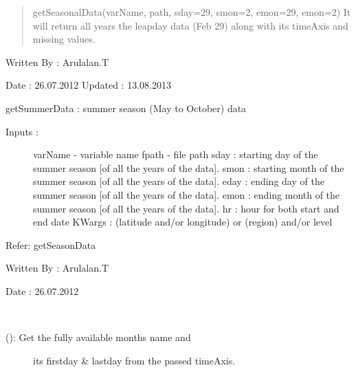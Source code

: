 \documentclass[letterpaper,10pt,english]{sphinxmanual}
\begin{document}
\begin{fulllineitems}
\begin{fulllineitems}
\begin{description}
\begin{description}
\begin{quote}
getSeasonalData(varName, path, sday=29, smon=2, emon=29, emon=2)
It will return all years the leapday data (Feb 29) along with
its timeAxis and missing values.
\end{quote}

\end{description}

\end{description}

Written By : Arulalan.T

Date : 26.07.2012
Updated : 13.08.2013

\end{fulllineitems}


\begin{fulllineitems}
\label{diagnosisutils:xml_data_access.TimeUtility.getSummerData}
getSummerData : summer season (May to October) data
\begin{description}
\item[{Inputs :}] \leavevmode
varName - variable name
fpath - file path
sday : starting day of the summer season {[}of all the years of the data{]}.
smon : starting month of the summer season {[}of all the years of the data{]}.
eday : ending day of the summer season {[}of all the years of the data{]}.
emon : ending month of the summer season {[}of all the years of the data{]}.
hr : hour for both start and end date
KWargs : (latitude and/or longitude) or (region) and/or level

\end{description}

Refer: getSeasonData

Written By : Arulalan.T

Date : 26.07.2012

\end{fulllineitems}


\begin{fulllineitems}
\label{diagnosisutils:xml_data_access.TimeUtility.getTimeAxisFullMonths}~\begin{description}
\item[{{\hyperref[diagnosisutils:xml_data_access.TimeUtility.getTimeAxisFullMonths]{}} (): Get the fully available months name and}] \leavevmode
its firstday \& lastday from the passed timeAxis.


\end{description}
\end{fulllineitems}
\end{fulllineitems}
\end{document}
